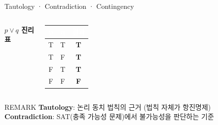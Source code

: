 \documentclass[10.5pt,compress]{beamer}
\newcommand{\Tcell}{\cellcolor{lightgreen!80}\textcolor{codegreen}{\textbf{T}}}
\newcommand{\Fcell}{\cellcolor{lightred!80}\textcolor{codered}{\textbf{F}}}
\begin{document}
\begin{frame}[t]{Tautology · Contradiction · Contingency}
\begin{columns}[t, totalwidth=\textwidth]
        \centering
        \scriptsize\textbf{$p \lor q$ 진리표}\\[0.1cm]
        \renewcommand{\arraystretch}{1.2}
        \begin{tabular}{|c|c|c|}
            \hline
            \rowcolor{amber!60}\textcolor{white}{p} & \textcolor{white}{q} & \textcolor{white}{결과} \\ \hline
            T & T & \Tcell \\ \hline
            T & F & \Tcell \\ \hline
            F & T & \Tcell \\ \hline
            F & F & \Fcell \\ \hline
        \end{tabular}
    \end{columns}

    \vfill %

    \begin{block}{REMARK}
        \scriptsize
        \textbf{\textcolor{codegreen}{Tautology}}: 논리 동치 법칙의 근거 (법칙 자체가 항진명제)\\
        \textbf{\textcolor{codered}{Contradiction}}: SAT(충족 가능성 문제)에서 불가능성을 판단하는 기준
    \end{block}
\end{frame}
\end{document}
